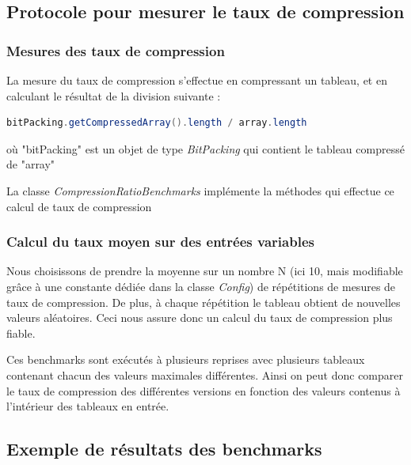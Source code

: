\documentclass[titlepage]{article}
\begin{document}
\subsection{Protocole pour mesurer le taux de compression}

\subsubsection{Mesures des taux de compression}

La mesure du taux de compression s'effectue en compressant un tableau, et en calculant le résultat  de la division suivante :
\begin{lstlisting}[language=Java] 
bitPacking.getCompressedArray().length / array.length
\end{lstlisting} 
où "bitPacking" est un objet de type \textsl{BitPacking} qui contient le tableau compressé de "array"
\par La classe \textsl{CompressionRatioBenchmarks} implémente la méthodes qui effectue ce calcul de taux de compression

\subsubsection{Calcul du taux moyen sur des entrées variables}

Nous choisissons de prendre la moyenne sur un nombre N (ici 10, mais modifiable grâce à une constante dédiée dans la classe \textsl{Config}) de répétitions de mesures de taux de compression. De plus, à chaque répétition le tableau obtient de nouvelles valeurs aléatoires. Ceci nous assure donc un calcul du taux de compression plus fiable.
\par Ces benchmarks sont exécutés à plusieurs reprises avec plusieurs tableaux contenant chacun des valeurs maximales différentes. Ainsi on peut donc comparer le taux de compression des différentes versions en fonction des valeurs contenus à l'intérieur des tableaux en entrée.

\subsection{Exemple de résultats des benchmarks}
\end{document}

